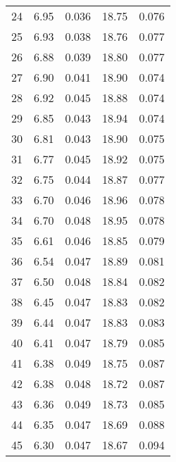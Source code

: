 \begin{table}
\begin{tabular}{c|ll|ll}
24 & 6.95 & 0.036 & 18.75 & 0.076 \\
25 & 6.93 & 0.038 & 18.76 & 0.077 \\
26 & 6.88 & 0.039 & 18.80 & 0.077 \\
27 & 6.90 & 0.041 & 18.90 & 0.074 \\
28 & 6.92 & 0.045 & 18.88 & 0.074 \\
29 & 6.85 & 0.043 & 18.94 & 0.074 \\
30 & 6.81 & 0.043 & 18.90 & 0.075 \\
31 & 6.77 & 0.045 & 18.92 & 0.075 \\
32 & 6.75 & 0.044 & 18.87 & 0.077 \\
33 & 6.70 & 0.046 & 18.96 & 0.078 \\
34 & 6.70 & 0.048 & 18.95 & 0.078 \\
35 & 6.61 & 0.046 & 18.85 & 0.079 \\
36 & 6.54 & 0.047 & 18.89 & 0.081 \\
37 & 6.50 & 0.048 & 18.84 & 0.082 \\
38 & 6.45 & 0.047 & 18.83 & 0.082 \\
39 & 6.44 & 0.047 & 18.83 & 0.083 \\
40 & 6.41 & 0.047 & 18.79 & 0.085 \\
41 & 6.38 & 0.049 & 18.75 & 0.087 \\
42 & 6.38 & 0.048 & 18.72 & 0.087 \\
43 & 6.36 & 0.049 & 18.73 & 0.085 \\
44 & 6.35 & 0.047 & 18.69 & 0.088 \\
45 & 6.30 & 0.047 & 18.67 & 0.094 \\
               \hline
        \end{tabular}
    \end{table}
    \clearpage

